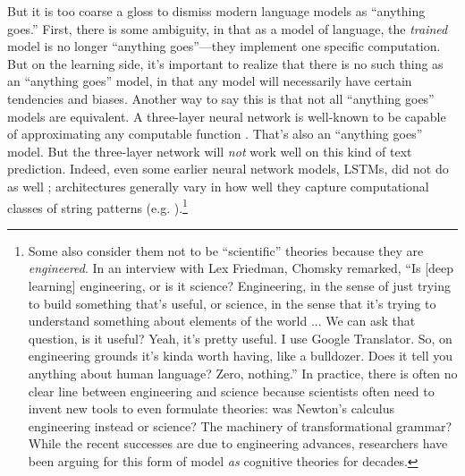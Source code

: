 \documentclass[output=paper,colorlinks,citecolor=brown
]{langscibook}
\begin{document}
But it is too coarse a gloss to dismiss modern language models as ``anything goes.'' First, there is some ambiguity, in that as a model of language, the \emph{trained} model is no longer ``anything goes''---they implement one specific computation. But on the learning side, it's important to realize that there is no such thing as an ``anything goes'' model, in that any model will necessarily have certain tendencies and biases. Another way to say this is that not all ``anything goes'' models are equivalent. A three-layer neural network is well-known to be capable of approximating any computable function \citep{siegelmann1995computational}. That's also an ``anything goes'' model. But the three-layer network will \emph{not} work well on this kind of text prediction. Indeed, even some earlier neural network models, LSTMs, did not do as well \citep{futrell2019neural,marvin2018targeted,hu2020systematic};  architectures generally vary in how well they capture  computational classes of string patterns (e.g. \cite{deletang2022neural}).\footnote{ Some also consider them not to be ``scientific'' theories because they are \emph{engineered}. In an interview with Lex Friedman, Chomsky remarked, ``Is [deep learning] engineering, or is it science? Engineering, in the sense of just trying to build something that's useful, or science, in the sense that it's trying to understand something about elements of the world ... We can ask that question, is it useful? Yeah, it's pretty useful. I use Google Translator. So, on engineering grounds it's kinda worth having, like a bulldozer. Does it tell you anything about human language? Zero, nothing.'' In practice, there is often no clear line between engineering and science because scientists often need to invent new tools to even formulate theories: was Newton's calculus engineering instead or science? The machinery of transformational grammar? While the recent successes are due to engineering advances, researchers have been arguing for this form of model \emph{as} cognitive theories for decades.} %
\end{document}
